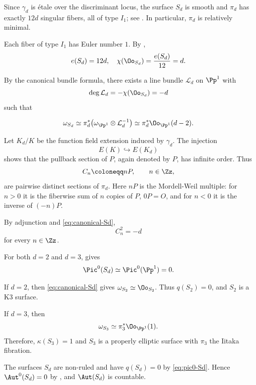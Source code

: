 \documentclass[12pt]{amsart}
\begin{document}
Since \(\gamma_d\) is \'etale over the
discriminant locus, the surface \(S_d\) is smooth and \(\pi_d\) has exactly
\(12d\) singular fibers, all of type \(I_1\); see
\cite[\S~5.2]{SS10}. In particular, \(\pi_d\) is relatively minimal.

Each fiber of type \(I_1\) has Euler number \(1\). By \cite[Theorem~6.10 and Corollary~6.11]{SS10},
\[
e(S_d)=12d, \quad\chi(\Oo_{S_d})=\frac{e(S_d)}{12}=d.
\]

By the canonical bundle formula, there exists a line bundle
\(\mathcal L_d\) on \(\Pp^1\) with
\[\deg\mathcal L_d=-\chi(\Oo_{S_d})=-d\] such that

\begin{equation}\label{eq:canonical-Sd}
\omega_{S_d}
\simeq
\pi_d^*
\bigl(\omega_{\Pp^1}\otimes\mathcal L_d^{-1}\bigr)\simeq
\pi_d^*\Oo_{\Pp^1}(d-2).
\end{equation}

Let \(K_d/K\) be the function field extension induced by \(\gamma_d\). The
injection
\[
E(K)\hookrightarrow E(K_d)
\]
shows that the pullback section of \(P\), again denoted by \(P\), has
infinite order. Thus
\[
C_n\coloneqq nP,\qquad n\in\Zz,
\]
are pairwise distinct sections of \(\pi_d\). Here $nP$ is the Mordell-Weil multiple: for $n>0$ it is the fiberwise sum of $n$ copies of $P$, $0P=O$, and for $n<0$ it is the inverse of $(-n)P$.

By adjunction and \eqref{eq:canonical-Sd}, 
\begin{equation}\label{eq:section-square}
C_n^2=-d
\end{equation}
for every \(n\in\Zz\).

For both $d=2$ and $d=3$, \cite[Theorem~6.12]{SS10} gives
\begin{equation}\label{eq:pic0-Sd}
 \Pic^0(S_d)\simeq\Pic^0(\Pp^1)=0.
\end{equation}

If \(d=2\), then \eqref{eq:canonical-Sd} gives \(\omega_{S_2}\simeq \Oo_{S_2}\).
Thus \(q(S_2)=0\), and \(S_2\) is a K3 surface.

If \(d=3\), then
\[
\omega_{S_3}\simeq\pi_3^*\Oo_{\Pp^1}(1).
\] 
Therefore, 
$
\kappa(S_3)=1
$
and $S_3$ is a properly elliptic surface with \(\pi_3\) the Iitaka fibration.

The surfaces $S_d$ are non-ruled and have $q(S_d)=0$ by \eqref{eq:pic0-Sd}. Hence $\Aut^0(S_d)=0$ by \cite[Corollary~4.7]{Han87}, and $\Aut(S_d)$ is countable.
\end{document}
